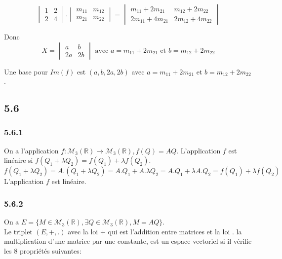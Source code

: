 \documentclass[]{book}
\theoremstyle{definition}
\newcommand{\bb}[1]{\mathbb{#1}}
\newcommand{\R}{\bb{R}}
\begin{document}
$$
\begin{vmatrix} 1 & 2 \\ 2 & 4 \end{vmatrix} . \begin{vmatrix} m_{11} & m_{12} \\ m_{21} & m_{22} \end{vmatrix} =
\begin{vmatrix} m_{11}+2m_{21} & m_{12}+2m_{22} \\ 2m_{11}+4m_{21} & 2m_{12}+4m_{22} \end{vmatrix} 
$$

Donc 
$$
X = \begin{vmatrix} a & b \\ 2a & 2b \end{vmatrix} \text{ avec } a =  m_{11}+2m_{21} \text{ et } b = m_{12}+2m_{22}
$$

Une base pour $Im(f)$ est $(a,b,2a,2b)$ avec $a =  m_{11}+2m_{21}$ et $b = m_{12}+2m_{22}$.


\subsection*{5.6}
\subsubsection*{5.6.1}
On a l'application $f: \mathcal{M}_3(\R) \to \mathcal{M}_3(\R), f(Q) = AQ$. L'application $f$ est lin\'eaire si $f(Q_1+\lambda Q_2) = f(Q_1) + \lambda f(Q_2)$.\\

$$
f(Q_1+\lambda Q_2) = A.(Q_1+\lambda Q_2) = A.Q_1 + A.\lambda Q_2 = A.Q_1 + \lambda A.Q_2 = f(Q_1) + \lambda f(Q_2)
$$
L'application $f$ est lin\'eaire.

\subsubsection*{5.6.2}
On a $E = \{M \in \mathcal{M}_3(\R), \exists Q \in \mathcal{M}_3(\R), M = AQ\}$.\\
Le triplet $(E,+,.)$ avec la loi $+$ qui est l'addition entre matrices et la loi $.$ la multiplication d'une matrice par une constante, est un espace vectoriel si il v\'erifie les 8 propri\'et\'es suivantes:
\end{document}
